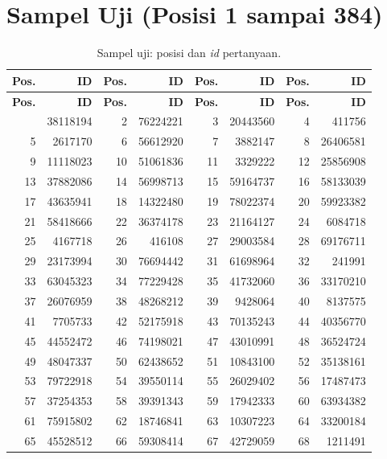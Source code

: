 \section{Sampel Uji (Posisi 1 sampai 384)}
\label{sec:lamp-id-uji}

\scriptsize

\begin{longtable}{|r|r|r|r|r|r|r|r|}
\caption{Sampel uji: posisi dan \emph{id} pertanyaan.}\label{tab:lamp-id-uji}\\
\hline
\textbf{Pos.} & \textbf{ID} & \textbf{Pos.} & \textbf{ID} & \textbf{Pos.} & \textbf{ID} & \textbf{Pos.} & \textbf{ID} \\
\hline
\endfirsthead
\hline
\textbf{Pos.} & \textbf{ID} & \textbf{Pos.} & \textbf{ID} & \textbf{Pos.} & \textbf{ID} & \textbf{Pos.} & \textbf{ID} \\
\hline
\endhead
\hline
\endfoot
1 & 38118194 & 2 & 76224221 & 3 & 20443560 & 4 & 411756 \\
5 & 2617170 & 6 & 56612920 & 7 & 3882147 & 8 & 26406581 \\
9 & 11118023 & 10 & 51061836 & 11 & 3329222 & 12 & 25856908 \\
13 & 37882086 & 14 & 56998713 & 15 & 59164737 & 16 & 58133039 \\
17 & 43635941 & 18 & 14322480 & 19 & 78022374 & 20 & 59923382 \\
21 & 58418666 & 22 & 36374178 & 23 & 21164127 & 24 & 6084718 \\
25 & 4167718 & 26 & 416108 & 27 & 29003584 & 28 & 69176711 \\
29 & 23173994 & 30 & 76694442 & 31 & 61698964 & 32 & 241991 \\
33 & 63045323 & 34 & 77229428 & 35 & 41732060 & 36 & 33170210 \\
37 & 26076959 & 38 & 48268212 & 39 & 9428064 & 40 & 8137575 \\
41 & 7705733 & 42 & 52175918 & 43 & 70135243 & 44 & 40356770 \\
45 & 44552472 & 46 & 74198021 & 47 & 43010991 & 48 & 36524724 \\
49 & 48047337 & 50 & 62438652 & 51 & 10843100 & 52 & 35138161 \\
53 & 79722918 & 54 & 39550114 & 55 & 26029402 & 56 & 17487473 \\
57 & 37254353 & 58 & 39391343 & 59 & 17942333 & 60 & 63934382 \\
61 & 75915802 & 62 & 18746841 & 63 & 10307223 & 64 & 33200184 \\
65 & 45528512 & 66 & 59308414 & 67 & 42729059 & 68 & 1211491 \\

\end{longtable}
